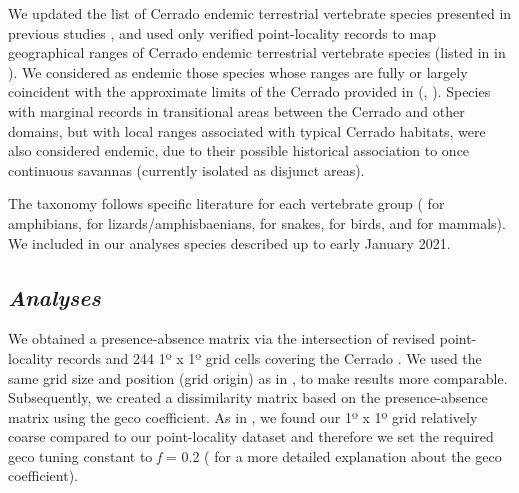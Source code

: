 \documentclass[12pt,openright,oneside,a4paper,english]{abntex2}
\begin{document}
We updated the list of Cerrado endemic terrestrial vertebrate species presented in previous studies \citep{Silva1997, Nogueira2011, Carmignotto2012, Azevedo2016, GutierrezMarinho2017}, and used only verified point-locality records to map geographical ranges of Cerrado endemic terrestrial vertebrate species (listed in  in ). We considered as endemic those species whose ranges are fully or largely coincident with the approximate limits of the Cerrado provided in \citeauthor{Dinerstein2017} (\citeyear{Dinerstein2017}, \citealp[see also][]{IBGE1993, Olson2001}). Species with marginal records in transitional areas between the Cerrado and other domains, but with local ranges associated with typical Cerrado habitats, were also considered endemic, due to their possible historical association to once continuous savannas (currently isolated as disjunct areas).

The taxonomy follows specific literature for each vertebrate group (\citealp{Frost2020} for amphibians, \citealp{Uetz2020} for lizards/amphisbaenians, \citealp{Nogueira2019} for snakes, \citealp{Pacheco2021birds} for birds, and \citealp{Abreu2021} for mammals). We included in our analyses species described up to early January 2021.


\subsection{\textit{Analyses}}

We obtained a presence-absence matrix via the intersection of revised point-locality records and 244 1º x 1º grid cells covering the Cerrado \citep{Dinerstein2017}. We used the same grid size and position (grid origin) as in \citet{Azevedo2016}, to make results more comparable. Subsequently, we created a dissimilarity matrix based on the presence-absence matrix using the geco coefficient. As in \citet{Azevedo2016}, we found our 1º x 1º grid relatively coarse compared to our point-locality dataset and therefore we set the required geco tuning constant to \textit{f} = 0.2 (\citealp[see][]{Hennig2006} for a more detailed explanation about the geco coefficient).
\end{document}
